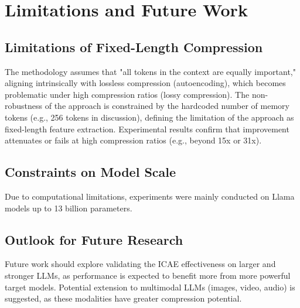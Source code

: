 \chapter{Limitations and Future Work}


\section{Limitations of Fixed-Length Compression}

The methodology assumes that "all tokens in the context are equally important," aligning intrinsically with lossless compression (autoencoding), which becomes problematic under high compression ratios (lossy compression). The non-robustness of the approach is constrained by the hardcoded number of memory tokens (e.g., 256 tokens in discussion), defining the limitation of the approach as fixed-length feature extraction. Experimental results confirm that improvement attenuates or fails at high compression ratios (e.g., beyond 15x or 31x).


\section{Constraints on Model Scale}

Due to computational limitations, experiments were mainly conducted on Llama models up to 13 billion parameters.


\section{Outlook for Future Research}

Future work should explore validating the ICAE effectiveness on larger and stronger LLMs, as performance is expected to benefit more from more powerful target models. Potential extension to multimodal LLMs (images, video, audio) is suggested, as these modalities have greater compression potential.
